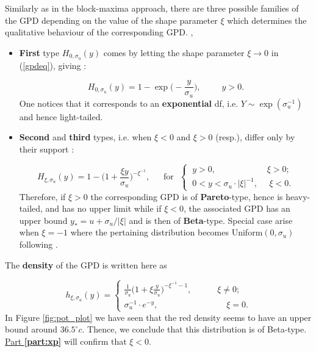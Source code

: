 Similarly as in the block-maxima approach, there are three possible families of the GPD depending on the value of the shape parameter $\xi$ which determines the qualitative behaviour of the corresponding GPD. \cite{hosking_parameter_1987}, \cite{singh_parameter_1995}

\begin{itemize}
	\item \textbf{First} type $H_{0,\sigma_u}(y)$ comes by letting the shape parameter $\xi\rightarrow 0$ in (\ref{gpdeq}), giving :
	
	\begin{equation}\label{gpd0}
	H_{0,\sigma_u}(y)=1-\exp
	\Big(-\frac{y}{\sigma_u}\Big), \ \ \ \ \ \ \ \ \ \ \ y>0.
	\end{equation}
	One notices that it corresponds to an \textbf{exponential} df, i.e. $Y\sim\exp(\sigma_u^{-1})$ and hence light-tailed.%
	
	\item \textbf{Second} and \textbf{third} types, i.e. when $\xi<0$ and $\xi>0$ (resp.), differ only by their support : 
	
	\begin{equation}\label{gpdm}
	H_{\xi,\sigma_u}(y)=1-\bigg(1+\frac{\xi y}{\sigma_u}\bigg)^{-\xi^{-1}}, \ \ \ \ \  \ \ \text{for} \ \ \ \begin{cases}
	\ y>0,  \ \ \ \ \ \ \ \ \ \ \ \ \ \ \  \ \ \qquad \ \xi>0; \\
	\  0<y<\sigma_u\cdot|\xi|^{-1}, \ \ \ \  \  \  \xi<0.
	\end{cases}
	\end{equation}
	Therefore, if $\xi>0$ the corresponding GPD is of \textbf{Pareto}-type, hence is heavy-tailed, and has no upper limit while if $\xi<0$, the associated GPD has an upper bound $y_*=u+\sigma_u/|\xi|$ and is then of \textbf{Beta}-type. Special case arise when $\xi=-1$ where the pertaining distribution becomes Uniform$(0,\sigma_u)$ following \citet[pp.186]{grimshaw_computing_1993}.
	
	
\end{itemize}
The \textbf{density} of the GPD is written here as

\begin{equation}\label{densgpd}
h_{\xi,\sigma_u}(y)=\begin{cases}
\frac{1}{\sigma_u}\bigg(1+\xi\frac{y}{\sigma_u}\bigg)^{-\xi^{-1}-1}, \qquad\quad \xi\neq 0; \\
\sigma_u^{-1}\cdot e^{-y},\qquad\qquad\qquad\qquad \xi= 0.
\end{cases}
\end{equation}
In Figure \ref{fig:pot_plot} we have seen that the red density seems to have an upper bound around $36.5^{\circ}c$. Thence, we conclude that this distribution is of Beta-type. \hyperref[part:xp]{Part \textbf{\ref{part:xp}}} will confirm that $\xi<0$.

